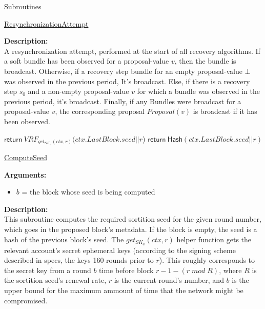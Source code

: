 \documentclass[10pt,a4paper]{article}
\begin{document}
\begin{section}{Subroutines}
\begin{algorithm}[H]
\begin{algorithmic}[1]
    \EndFunction
    \end{algorithmic}
    \caption{\underline{ResynchronizationAttempt}}
\end{algorithm}

\noindent \textbf{Description:}\\
A resynchronization attempt, performed at the start of all recovery algorithms.
If a soft bundle has been observed for a proposal-value $v$, then the bundle is broadcast.
Otherwise, if a recovery step bundle for an empty proposal-value $\bot$ was observed in the previous period,
It's broadcast.
Else, if there is a recovery step $s_0$ and a non-empty proposal-value $v$ for which a bundle was observed in the previous
period, it's broadcast.
Finally, if any Bundles were broadcast for a proposal-value $v$, the corresponding proposal $Proposal(v)$ is broadcast
if it has been observed.


\begin{algorithm}[H]
    \begin{algorithmic}[1]
            \State $\mathsf{return} \ VRF_{get_{SK_a}(ctx, r)}(ctx.LastBlock.seed||r$)
        \Else
            \State $\mathsf{return} \ \mathsf{Hash}(ctx.LastBlock.seed||r)$
        \EndIf
    \EndFunction
    \end{algorithmic}
    \caption{\underline{ComputeSeed}}
\end{algorithm}


\noindent \textbf{Arguments:}
\begin{itemize}
    \item $b$ = the block whose seed is being computed
  \end{itemize}


\noindent \textbf{Description:}\\
This subroutine computes the required sortition seed for the given round number, 
which goes in the proposed block's metadata.
If the block is empty, the seed is a hash of the previous block's seed.
The $get_{SK_a}(ctx, r)$ helper function gets the relevant account's secret ephemeral keys (according to the signing scheme described in specs, the keys 160 rounds prior to $r$).
This roughly corresponds to the secret key from a round $b$ time before block $r-1-(r\;mod\;R)$, where $R$ is the sortition seed's renewal rate, $r$ is the current round's number,
and $b$ is the upper bound for the maximum ammount of time that the network might be compromised.\\


\end{section}
\end{document}

